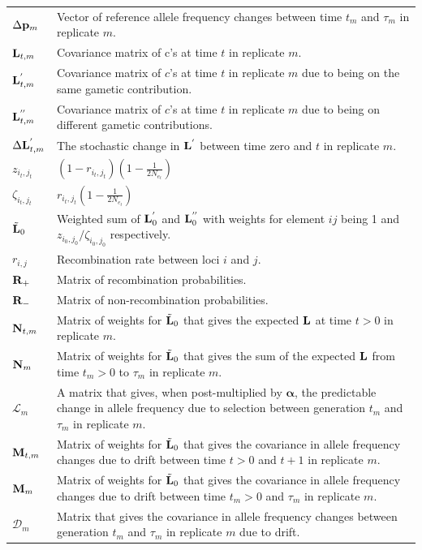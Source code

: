 \documentclass[12pt]{article}
\begin{document}
\begin{longtable}{|p{2cm}|p{13cm}|}
$\Delta {\bf p}_{m}$&Vector of reference allele frequency changes between time $t_m$ and $\tau_m$ in replicate $m$.\\
${\bf L}_{t,m}$&Covariance matrix of c's at time $t$ in replicate $m$.\\
${\bf L}^{'}_{t,m}$&Covariance matrix of $c$'s at time $t$ in replicate $m$ due to being on the same gametic contribution. \\
${\bf L}^{''}_{t,m}$&Covariance matrix of $c$'s at time $t$ in replicate $m$ due to being on different gametic contributions. \\
$\Delta{\bf L}^{'}_{t,m}$&The stochastic change in ${\bf L}^{'}$ between time zero and $t$ in replicate $m$.\\
$z_{i_{t},j_{t}}$&$(1-r_{i_{t},j_{t}})(1-\frac{1}{2N_{e_t}})$\\
$\zeta_{i_{t},j_{t}}$&$r_{i_{t},j_{t}}(1-\frac{1}{2N_{e_t}})$\\
$\tilde{\bf L}_{0}$&Weighted sum of ${\bf L}^{'}_0$ and ${\bf L}^{''}_0$ with weights for element $ij$ being 1 and $z_{i_{0},j_{0}}/\zeta_{i_{0},j_{0}}$ respectively.\\
$r_{i,j}$&Recombination rate between loci $i$ and $j$.\\
${\bf R}_{+}$&Matrix of recombination probabilities.\\
${\bf R}_{-}$&Matrix of non-recombination probabilities.\\
${\bf N}_{t,m}$&Matrix of weights for $\tilde{\bf L}_{0}$ that gives the expected ${\bf L}$ at time $t>0$ in replicate $m$.\\
${\bf N}_{m}$&Matrix of weights for $\tilde{\bf L}_{0}$ that gives the sum of the expected ${\bf L}$ from time $t_m>0$ to $\tau_m$ in replicate $m$.\\
$\boldsymbol{\mathcal{L}}_m$&A matrix that gives, when post-multiplied by $\boldsymbol{\alpha}$, the predictable change in allele frequency due to selection between generation $t_m$ and $\tau_m$ in replicate $m$.\\
${\bf M}_{t,m}$&Matrix of weights for $\tilde{\bf L}_{0}$ that gives the covariance in allele frequency changes  due to drift between time $t>0$ and $t+1$ in replicate $m$.\\
${\bf M}_{m}$&Matrix of weights for $\tilde{\bf L}_{0}$ that gives the covariance in allele frequency changes  due to drift between time $t_m>0$ and $\tau_m$ in replicate $m$.\\
$\boldsymbol{\mathcal{D}}_m$&Matrix that gives the covariance in allele frequency changes between generation $t_m$ and $\tau_m$ in replicate $m$ due to drift.\\

\end{longtable}
\end{document}
